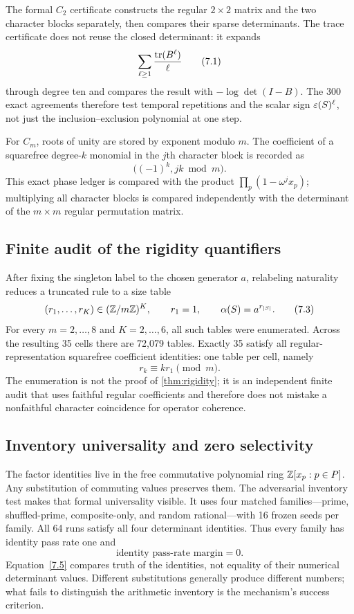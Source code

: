 The formal \(C_2\) certificate constructs the regular \(2\times2\) matrix and
the two character blocks separately, then compares their sparse
determinants.  The trace certificate does not reuse the closed determinant:
it expands
\[
\sum_{\ell\ge1}\frac{\operatorname{tr}(B^\ell)}{\ell}
\tag{7.1}\label{7.1}
\]
through degree ten and compares the result with
\(-\log\det(I-B)\).  The 300 exact agreements therefore test temporal
repetitions and the scalar sign \(\varepsilon(S)^\ell\), not just the
inclusion--exclusion polynomial at one step.

For \(C_m\), roots of unity are stored by exponent modulo \(m\).  The
coefficient of a squarefree degree-\(k\) monomial in the \(j\)th character
block is recorded as
\[
\bigl((-1)^k,jk\bmod m\bigr).
\tag{7.2}\label{7.2}
\]
This exact phase ledger is compared with the product
\(\prod_p(1-\omega^jx_p)\); multiplying all character blocks is compared
independently with the determinant of the \(m\times m\) regular permutation
matrix.

\subsection{Finite audit of the rigidity quantifiers}

After fixing the singleton label to the chosen generator \(a\), relabeling
naturality reduces a truncated rule to a size table
\[
(r_1,\ldots,r_K)\in(\mathbb Z/m\mathbb Z)^K,\qquad r_1=1,
\qquad \alpha(S)=a^{r_{|S|}}.
\tag{7.3}\label{7.3}
\]
For every \(m=2,\ldots,8\) and \(K=2,\ldots,6\), all such tables were
enumerated.  Across the resulting 35 cells there are 72,079 tables.  Exactly
35 satisfy all regular-representation squarefree coefficient identities:
one table per cell, namely
\[
r_k\equiv kr_1\pmod m.
\tag{7.4}\label{7.4}
\]
The enumeration is not the proof of \cref{thm:rigidity}; it is an independent
finite audit that uses faithful regular coefficients and therefore does not
mistake a nonfaithful character coincidence for operator coherence.

\subsection{Inventory universality and zero selectivity}

The factor identities live in the free commutative polynomial ring
\(\mathbb Z[x_p:p\in P]\).  Any substitution of commuting values preserves them.
The adversarial inventory test makes that formal universality visible.  It
uses four matched families---prime, shuffled-prime, composite-only, and
random rational---with 16 frozen seeds per family.  All 64 runs satisfy all
four determinant identities.  Thus every family has identity pass rate one
and
\[
\text{identity pass-rate margin}=0.
\tag{7.5}\label{7.5}
\]
Equation~\eqref{7.5} compares truth of the identities, not equality of their
numerical determinant values.  Different substitutions generally produce
different numbers; what fails to distinguish the arithmetic inventory is the
mechanism's success criterion.

